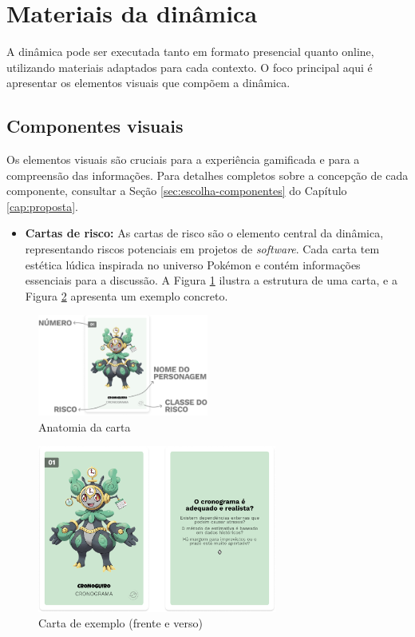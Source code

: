 \documentclass[
	12pt,
	openright,
	twoside,
	a4paper,
	english,
	brazil
	]{abntex2}
\begin{document}
\section{Materiais da dinâmica}
\label{sec:materiais-dinamica}

A dinâmica pode ser executada tanto em formato presencial quanto online, utilizando materiais adaptados para cada contexto. O foco principal aqui é apresentar os elementos visuais que compõem a dinâmica.

\subsection{Componentes visuais}
\label{sec:componentes-visuais}

Os elementos visuais são cruciais para a experiência gamificada e para a compreensão das informações. Para detalhes completos sobre a concepção de cada componente, consultar a Seção \ref{sec:escolha-componentes} do Capítulo \ref{cap:proposta}.

\begin{itemize}
\item \textbf{Cartas de risco:} As cartas de risco são o elemento central da dinâmica, representando riscos potenciais em projetos de \textit{software}. Cada carta tem estética lúdica inspirada no universo Pokémon e contém informações essenciais para a discussão. A Figura \ref{anatomia-carta} ilustra a estrutura de uma carta, e a Figura \ref{carta-exemplo-tarot} apresenta um exemplo concreto.
\end{itemize}

\begin{figure}[H]
\centering
\caption{\label{anatomia-carta} Anatomia da carta}
\includegraphics[width=0.5\textwidth]{anatomia-carta}
\end{figure}

\begin{figure}[H]
\centering
\caption{\label{carta-exemplo-tarot} Carta de exemplo (frente e verso)}
\includegraphics[width=0.7\textwidth]{carta-exemplo-tarot}
\end{figure}
\end{document}
